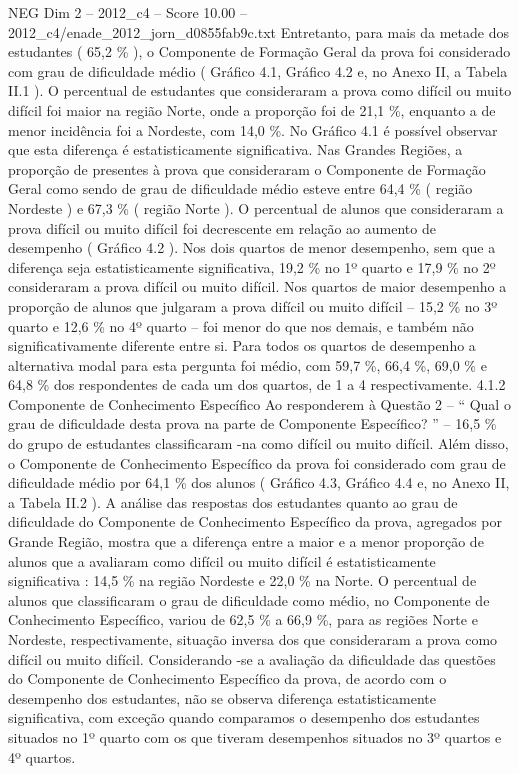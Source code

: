 \begin{textsample}{NEG Dim 2 – 2012\_c4 – Score 10.00 – 2012\_c4/enade\_2012\_jorn\_d0855fab9c.txt}
Entretanto, para mais da metade dos estudantes ( 65,2 \% ), o Componente de Formação Geral da prova foi considerado com grau de dificuldade médio ( Gráfico 4.1, Gráfico 4.2 e, no Anexo II, a Tabela II.1 ).
O percentual de estudantes que consideraram a prova como difícil ou muito difícil foi maior na região Norte, onde a proporção foi de 21,1 \%, enquanto a de menor incidência foi a Nordeste, com 14,0 \%.
No Gráfico 4.1 é possível observar que esta diferença é estatisticamente significativa.
Nas Grandes Regiões, a proporção de presentes à prova que consideraram o Componente de Formação Geral como sendo de grau de dificuldade médio esteve entre 64,4 \% ( região Nordeste ) e 67,3 \% ( região Norte ).
O percentual de alunos que consideraram a prova difícil ou muito difícil foi decrescente em relação ao aumento de desempenho ( Gráfico 4.2 ).
Nos dois quartos de menor desempenho, sem que a diferença seja estatisticamente significativa, 19,2 \% no 1º quarto e 17,9 \% no 2º consideraram a prova difícil ou muito difícil.
Nos quartos de maior desempenho a proporção de alunos que julgaram a prova difícil ou muito difícil – 15,2 \% no 3º quarto e 12,6 \% no 4º quarto – foi menor do que nos demais, e também não significativamente diferente entre si.
Para todos os quartos de desempenho a alternativa modal para esta pergunta foi médio, com 59,7 \%, 66,4 \%, 69,0 \% e 64,8 \% dos respondentes de cada um dos quartos, de 1 a 4 respectivamente. 4.1.2 Componente de Conhecimento Específico Ao responderem à Questão 2 – “ Qual o grau de dificuldade desta prova na parte de Componente Específico? ” – 16,5 \% do grupo de estudantes classificaram -na como difícil ou muito difícil.
Além disso, o Componente de Conhecimento Específico da prova foi considerado com grau de dificuldade médio por 64,1 \% dos alunos ( Gráfico 4.3, Gráfico 4.4 e, no Anexo II, a Tabela II.2 ).
A análise das respostas dos estudantes quanto ao grau de dificuldade do Componente de Conhecimento Específico da prova, agregados por Grande Região, mostra que a diferença entre a maior e a menor proporção de alunos que a avaliaram como difícil ou muito difícil é estatisticamente significativa : 14,5 \% na região Nordeste e 22,0 \% na Norte.
O percentual de alunos que classificaram o grau de dificuldade como médio, no Componente de Conhecimento Específico, variou de 62,5 \% a 66,9 \%, para as regiões Norte e Nordeste, respectivamente, situação inversa dos que consideraram a prova como difícil ou muito difícil.
Considerando -se a avaliação da dificuldade das questões do Componente de Conhecimento Específico da prova, de acordo com o desempenho dos estudantes, não se observa diferença estatisticamente significativa, com exceção quando comparamos o desempenho dos estudantes situados no 1º quarto com os que tiveram desempenhos situados no 3º quartos e 4º quartos.

\end{textsample}
